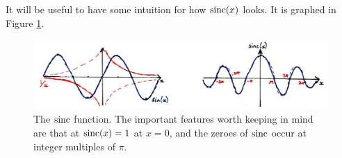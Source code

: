 %
It will be useful to have some intuition for how $\operatorname{sinc}(x)$ looks. It is
graphed in Figure \ref{fig::lecture_4_sinc}.
%
\begin{figure}[H]
  \includegraphics[width=\textwidth]{images/lecture_4_sinc.JPG}
  \caption{
    The $\operatorname{sinc}$ function. The important features worth keeping in mind are
    that at $\operatorname{sinc}(x) = 1$ at $x=0$, and the zeroes of $\operatorname{sinc}$ occur at
    integer multiples of $\pi$.
  }
  \label{fig::lecture_4_sinc}
\end{figure}

